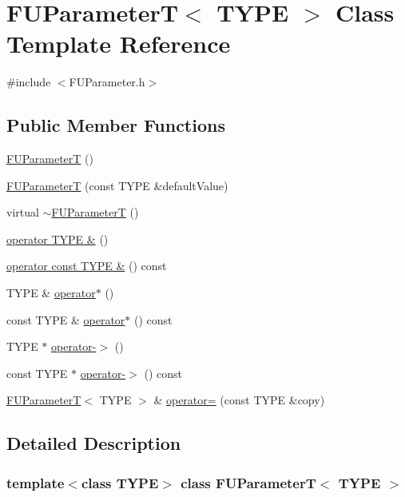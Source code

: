 \hypertarget{classFUParameterT}{
\section{FUParameterT$<$ TYPE $>$ Class Template Reference}
\label{classFUParameterT}
}


{\ttfamily \#include $<$FUParameter.h$>$}

\subsection*{Public Member Functions}
\begin{DoxyCompactItemize}
\item 
\hyperlink{classFUParameterT_afd54a7f281e88c83b50b9dddae6d492d}{FUParameterT} ()
\item 
\hyperlink{classFUParameterT_af16c1654ac45224aad98f412576c9613}{FUParameterT} (const TYPE \&defaultValue)
\item 
virtual \hyperlink{classFUParameterT_a5a7855cdecf56e2b8876bcd55889e5eb}{$\sim$FUParameterT} ()
\item 
\hyperlink{classFUParameterT_af94699b820b59f8e99f8d47f52d0ab41}{operator TYPE \&} ()
\item 
\hyperlink{classFUParameterT_aa3f3ebf4d161d9f25c1cabe8930dbcb9}{operator const TYPE \&} () const 
\item 
TYPE \& \hyperlink{classFUParameterT_a7bf69b1165e49a914b0d4b613805431b}{operator$\ast$} ()
\item 
const TYPE \& \hyperlink{classFUParameterT_af2840ab65f1dabe425951340139cc068}{operator$\ast$} () const 
\item 
TYPE $\ast$ \hyperlink{classFUParameterT_a29da053f64be0875a9cb4618a98f45b1}{operator-\/$>$} ()
\item 
const TYPE $\ast$ \hyperlink{classFUParameterT_a0fb4e55c4cf0f072c3f1a0594d0e6dbb}{operator-\/$>$} () const 
\item 
\hyperlink{classFUParameterT}{FUParameterT}$<$ TYPE $>$ \& \hyperlink{classFUParameterT_a56ef63916af42d47fc4ecab3a7b93ec3}{operator=} (const TYPE \&copy)
\end{DoxyCompactItemize}


\subsection{Detailed Description}
\subsubsection*{template$<$class TYPE$>$ class FUParameterT$<$ TYPE $>$}

